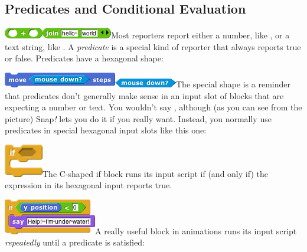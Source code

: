 \subsection{\texorpdfstring{\hfill\break
Predicates and Conditional
Evaluation}{ Predicates and Conditional Evaluation}}\label{predicates-and-conditional-evaluation}

\includegraphics[width=0.66667in,height=0.1875in]{media/image82.png}\includegraphics[width=1.20833in,height=0.1875in]{media/image83.png}Most
reporters report either a number, like , or a text string, like . A
\emph{predicate} is a special kind of reporter that always reports true
or false. Predicates have a hexagonal shape:

\includegraphics[width=1.94792in,height=0.26042in]{media/image84.png}\includegraphics[width=1.07292in,height=0.15625in]{media/image85.png}The
special shape is a reminder that predicates don't generally make sense
in an input slot of blocks that are expecting a number or text. You
wouldn't say , although (as you can see from the picture) Snap\emph{!}
lets you do it if you really want. Instead, you normally use predicates
in special hexagonal input slots like this one:

\includegraphics[width=0.66667in,height=0.56944in]{media/image86.png}The
C-shaped if block runs its input script if (and only if) the expression
in its hexagonal input reports true.

\includegraphics[width=1.59375in,height=0.61458in]{media/image87.png}A
really useful block in animations runs its input script
\emph{repeatedly} until a predicate is satisfied:


